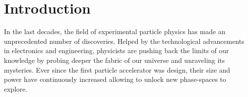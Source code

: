 \chapter*{Introduction}
\label{chap:0-4-introduction}

  In the last decades, the field of experimental particle physics has made an unprecedented number of discoveries. Helped by the technological advancements in electronics and engineering, physicists are pushing back the limits of our knowledge by probing deeper the fabric of our universe and unraveling its mysteries. Ever since the first particle accelerator was design, their size and power have continuously increased allowing to unlock new phase-spaces to explore. 
